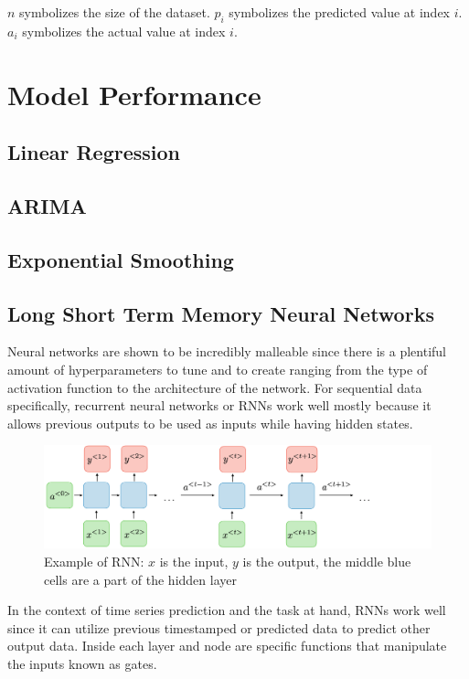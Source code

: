 \documentclass[sigconf,nonacm]{acmart}
\begin{document}
$n$ symbolizes the size of the dataset. $p_i$ symbolizes the predicted value at index $i$. $a_i$ symbolizes the actual value at index $i$.

\section{Model Performance}
\subsection{Linear Regression}
\subsection{ARIMA}
\subsection{Exponential Smoothing}
\subsection{Long Short Term Memory Neural Networks}

Neural networks are shown to be incredibly malleable since there is a plentiful amount of hyperparameters to tune and to create ranging from the type of activation function to the architecture of the network. For sequential data specifically, recurrent neural networks or RNNs work well mostly because it allows previous outputs to be used as inputs while having hidden states. 

\begin{figure}
  \centering
  \includegraphics[width=\linewidth]{figures/architecture-rnn-ltr.png}
  \caption{Example of RNN: $x$ is the input, $y$ is the output, the middle blue cells are a part of the hidden layer}
  \label{fig:rnn}
\end{figure}

 In the context of time series prediction and the task at hand, RNNs work well since it can utilize previous timestamped or predicted data to predict other output data. Inside each layer and node are specific functions that manipulate the inputs known as gates.
\end{document}
